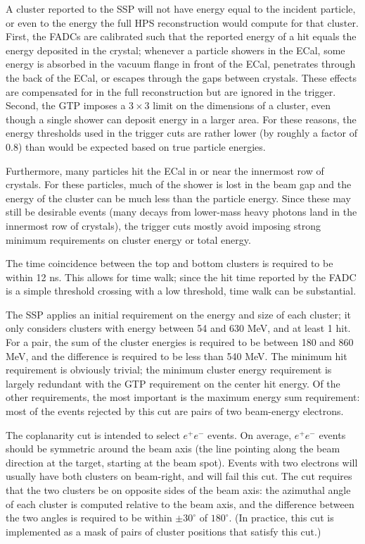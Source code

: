A cluster reported to the SSP will not have energy equal to the incident particle, or even to the energy the full HPS reconstruction would compute for that cluster.
First, the FADCs are calibrated such that the reported energy of a hit equals the energy deposited in the crystal; whenever a particle showers in the ECal, some energy is absorbed in the vacuum flange in front of the ECal, penetrates through the back of the ECal, or escapes through the gaps between crystals.
These effects are compensated for in the full reconstruction but are ignored in the trigger.
Second, the GTP imposes a $3\times 3$ limit on the dimensions of a cluster, even though a single shower can deposit energy in a larger area.
For these reasons, the energy thresholds used in the trigger cuts are rather lower (by roughly a factor of 0.8) than would be expected based on true particle energies.

Furthermore, many particles hit the ECal in or near the innermost row of crystals.
For these particles, much of the shower is lost in the beam gap and the energy of the cluster can be much less than the particle energy.
Since these may still be desirable events (many decays from lower-mass heavy photons land in the innermost row of crystals), the trigger cuts mostly avoid imposing strong minimum requirements on cluster energy or total energy.

The time coincidence between the top and bottom clusters is required to be within 12 ns.
This allows for time walk; since the hit time reported by the FADC is a simple threshold crossing with a low threshold, time walk can be substantial.

The SSP applies an initial requirement on the energy and size of each cluster; it only considers clusters with energy between 54 and 630 MeV, and at least 1 hit.
For a pair, the sum of the cluster energies is required to be between 180 and 860 MeV, and the difference is required to be less than 540 MeV.
The minimum hit requirement is obviously trivial; the minimum cluster energy requirement is largely redundant with the GTP requirement on the center hit energy.
Of the other requirements, the most important is the maximum energy sum requirement: most of the events rejected by this cut are pairs of two beam-energy electrons.

The coplanarity cut is intended to select $e^+e^-$ events.
On average, $e^+e^-$ events should be symmetric around the beam axis (the line pointing along the beam direction at the target, starting at the beam spot).
Events with two electrons will usually have both clusters on beam-right, and will fail this cut.
The cut requires that the two clusters be on opposite sides of the beam axis: the azimuthal angle of each cluster is computed relative to the beam axis, and the difference between the two angles is required to be within $\pm 30^\circ$ of $180^\circ$.
(In practice, this cut is implemented as a mask of pairs of cluster positions that satisfy this cut.)

